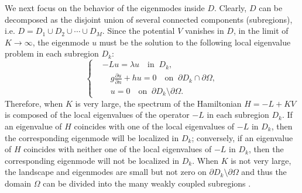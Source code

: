 \documentclass[a4paper,11pt]{article}
\begin{document}
We next focus on the behavior of the eigenmodes inside $D$. Clearly, $D$ can be decomposed as the disjoint union of several connected components (subregions), i.e. $D = D_1 \cup D_2 \cup \cdots \cup D_M$. Since the potential $V$ vanishes in $D$, in the limit of $K\rightarrow\infty$, the eigenmode $u$ must be the solution to the following local eigenvalue problem in each subregion $D_k$:
\begin{equation}\label{subregion}
\left\{
\begin{split}
& - L u = \lambda u \quad \textrm{in}\;\;D_k, \\
& \quad g \frac{\partial u}{\partial n} + h u = 0 \quad \textrm{on}\;\;\partial D_k \cap \partial \Omega, \\
& \quad u = 0 \quad \textrm{on}\;\;\partial D_k \setminus \partial \Omega.
\end{split}
\right.
\end{equation}
Therefore, when $K$ is very large, the spectrum of the Hamiltonian $H = - L + K V$ is composed of the local eigenvalues of the operator $-L$ in each subregion $D_k$. If an eigenvalue of $H$ coincides with one of the local eigenvalues of $-L$ in $D_k$, then the corresponding eigenmode will be localized in $D_k$; conversely, if an eigenvalue of $H$ coincides with neither one of the local eigenvalues of $-L$ in $D_k$, then the corresponding eigenmode will not be localized in $D_k$. When $K$ is not very large, the landscape and eigenmodes are small but not zero on $\partial D_k \setminus \partial \Omega$ and thus the domain $\Omega$ can be divided into the many weakly coupled subregions \cite{filoche2012universal}.
\end{document}
